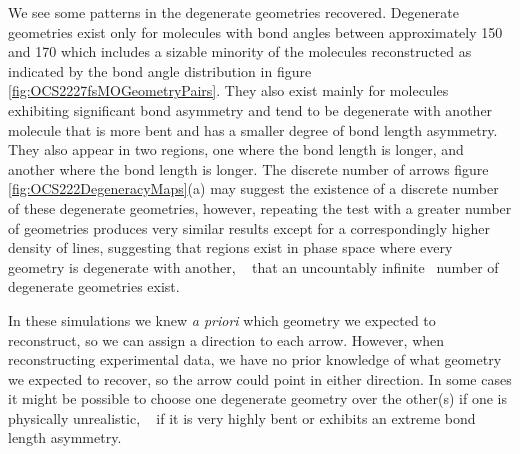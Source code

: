 We see some patterns in the degenerate geometries recovered. Degenerate geometries exist only for molecules with bond angles between approximately \SI{150}{\deg} and \SI{170}{\deg} which includes a sizable minority of the molecules reconstructed as indicated by the bond angle distribution in figure \ref{fig:OCS2227fsMOGeometryPairs}. They also exist mainly for molecules exhibiting significant bond asymmetry and tend to be degenerate with another molecule that is more bent and has a smaller degree of bond length asymmetry. They also appear in two regions, one where the  bond length is longer, and another where the  bond length is longer. The discrete number of arrows figure \ref{fig:OCS222DegeneracyMaps}(a) may suggest the existence of a discrete number of these degenerate geometries, however, repeating the test with a greater number of geometries produces very similar results except for a correspondingly higher density of lines, suggesting that regions exist in phase space where every geometry is degenerate with another, \ie~ that an uncountably infinite\footnotemark~ number of degenerate geometries exist.


In these simulations we knew \textit{a priori} which geometry we expected to reconstruct, so we can assign a direction to each arrow. However, when reconstructing experimental data, we have no prior knowledge of what geometry we expected to recover, so the arrow could point in either direction. In some cases it might be possible to choose one degenerate geometry over the other(s) if one is physically unrealistic, \eg~ if it is very highly bent or exhibits an extreme bond length asymmetry.

